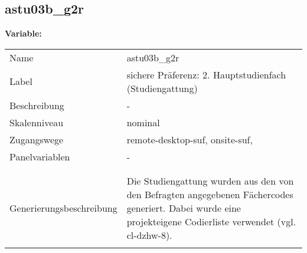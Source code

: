 	
	
	\subsection{astu03b\_g2r}
	\label{subSection:astu03b_g2r}

	\noindent\textbf{Variable:}\\
		\begin{tabular}{lL{11.3cm}}
			\label{tableVariable:astu03b_g2r}
			Name & astu03b\_g2r \\
			Label & sichere Präferenz: 2. Hauptstudienfach  (Studiengattung) \\
			Beschreibung & - \\
			Skalenniveau & nominal \\
			Zugangswege &
				remote-desktop-suf,
				onsite-suf,
 \\
			Panelvariablen & -
			 \\
			 \\
 \\
					Generierungsbeschreibung & Die Studiengattung wurden aus den von den Befragten angegebenen Fächercodes generiert.  Dabei wurde eine projekteigene Codierliste verwendet (vgl. cl-dzhw-8).
				 \\	
			 \\
		\end{tabular}






